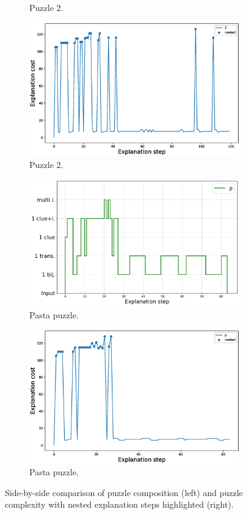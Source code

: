 \begin{figure}[t!]
\begin{subfigure}{.5\textwidth}
				\caption{Puzzle 2.}
				\label{fig:composition_puzzle:p2}
		\end{subfigure}%
		\begin{subfigure}{.5\textwidth}
				\centering
				\includegraphics[width=0.84\linewidth]{figures/2.eps}
				\caption{Puzzle 2.}
				\label{fig:cost_puzzle:p2}
		\end{subfigure}
		\begin{subfigure}{.5\textwidth}
				\centering
				\includegraphics[width=0.9\linewidth]{figures/plot_cost_steps_p.pdf}
				\caption{Pasta puzzle.}
				\label{fig:composition_puzzle:pasta}
		\end{subfigure}%
		\begin{subfigure}{.5\textwidth}
				\centering
				\includegraphics[width=0.84\linewidth]{figures/p.eps}
				\caption{Pasta puzzle.}
				\label{fig:cost_puzzle:pasta}
		\end{subfigure}
		\caption{Side-by-side comparison of puzzle composition (left) and puzzle complexity with nested explanation steps highlighted (right).}
		\label{fig:steps}
\end{figure}

